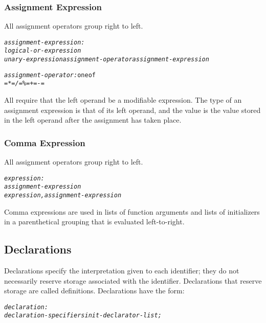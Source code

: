 \documentclass[12pt]{report}
\begin{document}
\subsubsection{Assignment Expression}

All assignment operators group right to left.

\begin{alltt}\begin{singlespace}
    \textit{assignment-expression:}
        \textit{logical-or-expression}
        \textit{unary-expression assignment-operator assignment-expression}
              
    \textit{assignment-operator:} one of
        \textit{=     *=     /=     \%=     +=     -=}\end{singlespace}
\end{alltt}

All require that the left operand be a modifiable expression. The type of an assignment expression is that of its left operand, and the value is the value stored in the left operand after the assignment has taken place.

\subsubsection{Comma Expression}

All assignment operators group right to left.

\begin{alltt}\begin{singlespace}
         \textit{expression:}
              \textit{assignment-expression}
              \textit{expression , assignment-expression}\end{singlespace}
\end{alltt}

Comma expressions are used in lists of function arguments and lists of initializers in a parenthetical grouping that is evaluated left-to-right.

\subsection{Declarations}

Declarations specify the interpretation given to each identifier; they do not necessarily reserve storage associated with the identifier. Declarations that reserve storage are called definitions. Declarations have the form:

\begin{alltt}\begin{singlespace}
         \textit{declaration:}
              \textit{declaration-specifiers init-declarator-list;}\end{singlespace}
\end{alltt}
\end{document}
